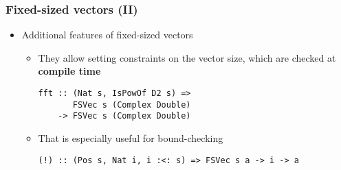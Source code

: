 \documentclass{beamer}
\begin{document}
\begin{frame}[fragile]
  \frametitle{Fixed-sized vectors (II)}
\begin{itemize}
  \item Additional features of fixed-sized vectors
    \begin{itemize}
      \item They allow setting constraints on the vector size, which
        are checked at \textbf{compile time}
\begin{lstlisting}
fft :: (Nat s, IsPowOf D2 s) => 
       FSVec s (Complex Double) 
    -> FSVec s (Complex Double)
\end{lstlisting}
        \pause
      \item That is especially useful for bound-checking
\begin{lstlisting}
(!) :: (Pos s, Nat i, i :<: s) => FSVec s a -> i -> a        
\end{lstlisting}
      \end{itemize}
  \end{itemize}
\end{frame}

\beamerdefaultoverlayspecification{<+->}
\end{document}
